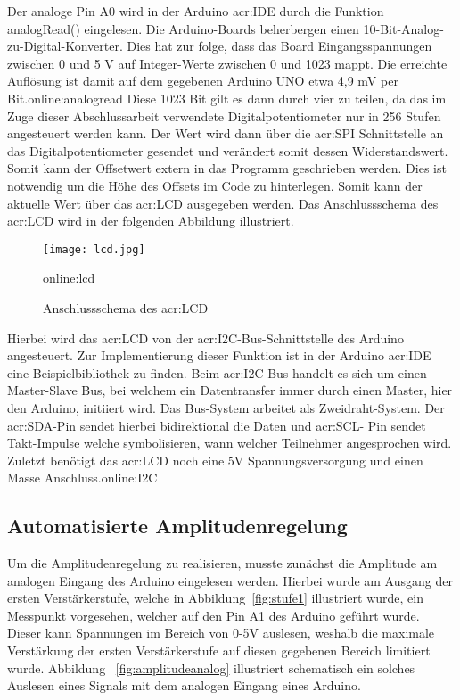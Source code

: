 Der analoge Pin A0 wird in der Arduino \gls{acr:IDE} durch die Funktion analogRead() eingelesen. Die Arduino-Boards beherbergen einen 10-Bit-Analog-zu-Digital-Konverter. Dies hat zur folge, dass das Board Eingangsspannungen zwischen 0 und 5 V auf Integer-Werte zwischen 0 und 1023 mappt. Die erreichte Auflösung ist damit auf dem gegebenen Arduino UNO etwa 4,9 mV per Bit.\gls{online:analogread} Diese 1023 Bit gilt es dann durch vier zu teilen, da das im Zuge dieser Abschlussarbeit verwendete Digitalpotentiometer nur in 256 Stufen angesteuert werden kann. Der Wert wird dann über die \gls{acr:SPI} Schnittstelle an das Digitalpotentiometer gesendet und verändert somit dessen Widerstandswert. Somit kann der Offsetwert extern in das Programm geschrieben werden. Dies ist notwendig um die Höhe des Offsets im Code zu hinterlegen. Somit kann der aktuelle Wert über das \gls{acr:LCD} ausgegeben werden. Das Anschlussschema des \gls{acr:LCD} wird in der folgenden Abbildung illustriert.

\begin{figure}[H]
	\centering
	\texttt{[image: lcd.jpg]}
	\caption[Anschlussschema des \gls{acr:LCD}]{Anschlussschema des \gls{acr:LCD}} 
	\gls{online:lcd}
	\label{fig:lcd}
\end{figure}

Hierbei wird das \gls{acr:LCD} von der \gls{acr:I2C}-Bus-Schnittstelle des Arduino angesteuert. Zur Implementierung dieser Funktion ist in der Arduino \gls{acr:IDE} eine Beispielbibliothek zu finden. Beim \gls{acr:I2C}-Bus handelt es sich um einen Master-Slave Bus, bei welchem ein Datentransfer immer durch einen Master, hier den Arduino, initiiert wird. Das Bus-System arbeitet als Zweidraht-System. Der \gls{acr:SDA}-Pin sendet hierbei bidirektional die Daten und \gls{acr:SCL}- Pin sendet Takt-Impulse welche symbolisieren, wann welcher Teilnehmer angesprochen wird. Zuletzt benötigt das \gls{acr:LCD} noch eine 5V Spannungsversorgung und einen Masse Anschluss.\gls{online:I2C}
\newpage
\subsection{Automatisierte Amplitudenregelung}
\label{subsec:autoamp}

Um die Amplitudenregelung zu realisieren, musste zunächst die Amplitude am analogen Eingang des Arduino eingelesen werden. Hierbei wurde am Ausgang der ersten Verstärkerstufe, welche in Abbildung~\ref{fig:stufe1} illustriert wurde, ein Messpunkt vorgesehen, welcher auf den Pin A1 des Arduino geführt wurde. Dieser kann Spannungen im Bereich von 0-5V auslesen, weshalb die maximale Verstärkung der ersten Verstärkerstufe auf diesen gegebenen Bereich limitiert wurde. Abbildung ~\ref{fig:amplitudeanalog} illustriert schematisch ein solches Auslesen eines Signals mit dem analogen Eingang eines Arduino. 

